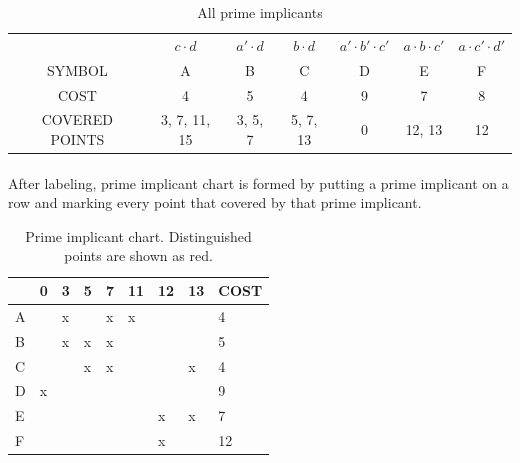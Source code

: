 \documentclass[pdftex,12pt,a4paper]{article}
\begin{document}
\begin{flushleft}
\begin{table}[h]
\begin{tabular}{ccccccc}
              & $c \cdot d$  & $a' \cdot d$ & $b \cdot d$ & $a' \cdot b' \cdot c'$ & $a \cdot b \cdot c'$ & $a \cdot c' \cdot d'$ \\
SYMBOL         & A            & B            & C           & D                      & E                    & F                     \\
COST           & 4            & 5            & 4           & 9                      & 7                    & 8                     \\
COVERED POINTS & 3, 7, 11, 15 & 3, 5, 7      & 5, 7, 13    & 0                      & 12, 13               & 12                   
\end{tabular}

\caption{All prime implicants}
\label{ponisandta}
\end{table}



\begin{flushleft}
\paragraph{}
After labeling, prime implicant chart is formed by putting a prime implicant on a row and marking every point that covered by that prime implicant. 
\end{flushleft}



\begin{table}[h]
\centering
\begin{tabular}{l|l|l|l|l|l|l|l|l|}
\cline{2-9}
                        & 0                        & 3 & 5 & 7 & 11                       & 12 & 13                       & COST \\ \hline
\multicolumn{1}{|l|}{A} &                          & x &   & x & {\color[HTML]{FE0000} x} &    &                          & 4    \\ \hline
\multicolumn{1}{|l|}{B} &                          & x & x & x &                          &    &                          & 5    \\ \hline
\multicolumn{1}{|l|}{C} &                          &   & x & x &                          &    & {\color[HTML]{FE0000} x} & 4    \\ \hline
\multicolumn{1}{|l|}{D} & {\color[HTML]{FE0000} x} &   &   &   &                          &    &                          & 9    \\ \hline
\multicolumn{1}{|l|}{E} &                          &   &   &   &                          & x  & x                        & 7    \\ \hline
\multicolumn{1}{|l|}{F} &                          &   &   &   &                          & x  &                          & 12   \\ \hline
\end{tabular}
\caption{Prime implicant chart. Distinguished points are shown as red.}
\label{primeimplicantchart}
\end{table}


\end{flushleft}
\end{document}
